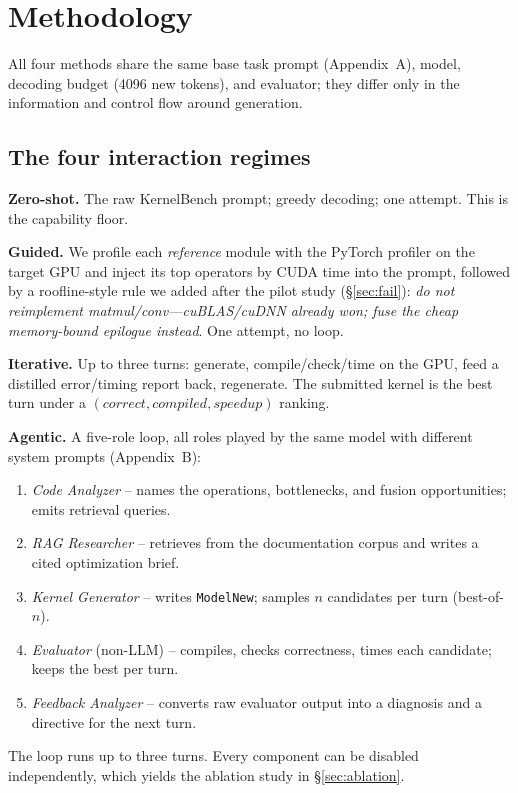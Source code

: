 \documentclass[conference]{IEEEtran}
\begin{document}
\section{Methodology}\label{sec:method}

All four methods share the same base task prompt (Appendix~A), model, decoding
budget (4096 new tokens), and evaluator; they differ only in the information and
control flow around generation.

\subsection{The four interaction regimes}

\textbf{Zero-shot.} The raw KernelBench prompt; greedy decoding; one attempt. This
is the capability floor.

\textbf{Guided.} We profile each \emph{reference} module with the PyTorch profiler
on the target GPU and inject its top operators by CUDA time into the prompt,
followed by a roofline-style rule we added after the pilot study (\S\ref{sec:fail}):
\emph{do not reimplement matmul/conv---cuBLAS/cuDNN already won; fuse the cheap
memory-bound epilogue instead}. One attempt, no loop.

\textbf{Iterative.} Up to three turns: generate, compile/check/time on the GPU,
feed a distilled error/timing report back, regenerate. The submitted kernel is the
best turn under a $(\textit{correct},\textit{compiled},\textit{speedup})$ ranking.

\textbf{Agentic.} A five-role loop, all roles played by the same model with
different system prompts (Appendix~B):
\begin{enumerate}
  \item \emph{Code Analyzer} -- names the operations, bottlenecks, and fusion
        opportunities; emits retrieval queries.
  \item \emph{RAG Researcher} -- retrieves from the documentation corpus and writes
        a cited optimization brief.
  \item \emph{Kernel Generator} -- writes \texttt{ModelNew}; samples $n$ candidates
        per turn (best-of-$n$).
  \item \emph{Evaluator} (non-LLM) -- compiles, checks correctness, times each
        candidate; keeps the best per turn.
  \item \emph{Feedback Analyzer} -- converts raw evaluator output into a diagnosis
        and a directive for the next turn.
\end{enumerate}
The loop runs up to three turns. Every component can be disabled independently,
which yields the ablation study in \S\ref{sec:ablation}.
\end{document}
